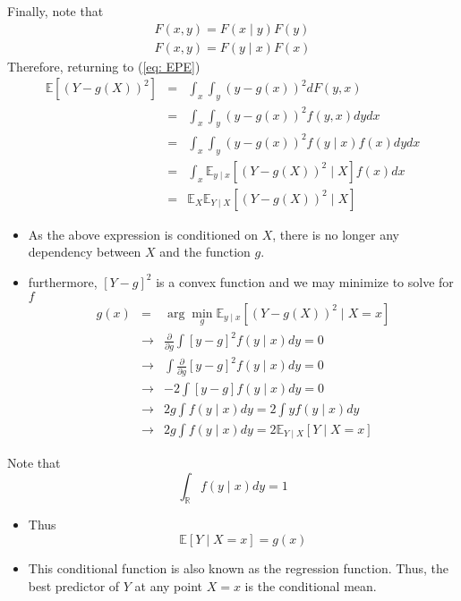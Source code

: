 \documentclass{beamer}
\newcommand{\E}{\mathbb{E}}
\newcommand{\R}{\mathbb{R}}
\begin{document}
\begin{frame}
Finally, note that 
\begin{eqnarray*}
F(x,y)=F(x\mid y)F(y)\\
F(x,y)=F(y\mid x)F(x)
\end{eqnarray*}
Therefore, returning to (\ref{eq: EPE})
\begin{eqnarray*}
\E[(Y-g(X))^2]&=&\int_x\int_y(y-g(x))^2dF(y,x)\\
&=&\int_x\int_y(y-g(x))^2f(y,x)dydx\\
&=&\int_x\int_y(y-g(x))^2f(y\mid x)f(x)dydx\\
&=&\int_x\E_{y\mid x}[(Y-g(X))^2\mid X]f(x)dx\\
&=&\E_X\E_{Y\mid X}[(Y-g(X))^2\mid X]
\end{eqnarray*}
\end{frame}

\begin{frame}
\begin{itemize}
\item{} As the above expression is conditioned on $X$, there is no longer any dependency between $X$ and the function $g$.

\item{} furthermore, $[Y-g]^2$ is a convex function and we may minimize to solve for $f$
\begin{eqnarray*}
g(x)&=&\arg\min_{g}\E_{y\mid x}[(Y-g(X))^2\mid X=x]\\
&\rightarrow& \frac{\partial}{\partial g}\int[y-g]^2 f(y\mid x)dy=0\\
&\rightarrow& \int \frac{\partial}{\partial g}[y-g]^2 f(y\mid x)dy=0\\
&\rightarrow& -2\int[y-g]  f(y\mid x)dy=0\\
&\rightarrow& 2g\int f(y\mid x)dy=2\int y  f(y\mid x)dy\\
&\rightarrow& 2g\int f(y\mid x)dy=2\E_{Y\mid X}[Y\mid X=x]
\end{eqnarray*}
\end{itemize}
\end{frame}

\begin{frame}
Note that 
\[
\int_{\R}f(y\mid x)dy=1
\]
\begin{itemize}
\item{}Thus
\[
\E[Y\mid X=x]=g(x)
\]
\item{} This conditional function is also known as the regression function. Thus, the best predictor of $Y$ at any point $X=x$ is the conditional mean.
\end{itemize}
\end{frame}
\end{document}
